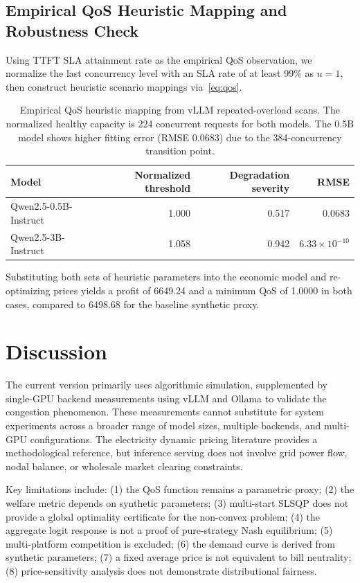 \documentclass[11pt]{article}
\begin{document}
\subsection{Empirical QoS Heuristic Mapping and Robustness Check}

Using TTFT SLA attainment rate as the empirical QoS observation, we
normalize the last concurrency level with an SLA rate of at least 99\% as
$u=1$, then construct heuristic scenario mappings via~\eqref{eq:qos}.

\begin{table}[htbp]
\centering
\caption{Empirical QoS heuristic mapping from vLLM repeated-overload scans.
The normalized healthy capacity is 224 concurrent requests for both models.
The 0.5B model shows higher fitting error (RMSE 0.0683) due to the 384-concurrency transition point.}
\label{tab:qos_fit}
\begin{tabular}{lrrr}
\toprule
Model & Normalized threshold & Degradation severity & RMSE \\
\midrule
Qwen2.5-0.5B-Instruct & 1.000 & 0.517 & 0.0683 \\
Qwen2.5-3B-Instruct & 1.058 & 0.942 & $6.33\times10^{-10}$ \\
\bottomrule
\end{tabular}
\end{table}

Substituting both sets of heuristic parameters into the economic model and
re-optimizing prices yields a profit of 6649.24 and a minimum QoS of 1.0000
in both cases, compared to 6498.68 for the baseline synthetic proxy.

\section{Discussion}
\label{sec:discussion}

The current version primarily uses algorithmic simulation, supplemented by
single-GPU backend measurements using vLLM and Ollama to validate the
congestion phenomenon. These measurements cannot substitute for system
experiments across a broader range of model sizes, multiple backends, and
multi-GPU configurations. The electricity dynamic pricing literature
provides a methodological reference, but inference serving does not involve
grid power flow, nodal balance, or wholesale market clearing constraints.

Key limitations include: (1) the QoS function remains a parametric proxy;
(2) the welfare metric depends on synthetic parameters; (3) multi-start
SLSQP does not provide a global optimality certificate for the non-convex
problem; (4) the aggregate logit response is not a proof of pure-strategy
Nash equilibrium; (5) multi-platform competition is excluded; (6) the
demand curve is derived from synthetic parameters; (7) a fixed average
price is not equivalent to bill neutrality; (8) price-sensitivity analysis
does not demonstrate distributional fairness.
\end{document}
